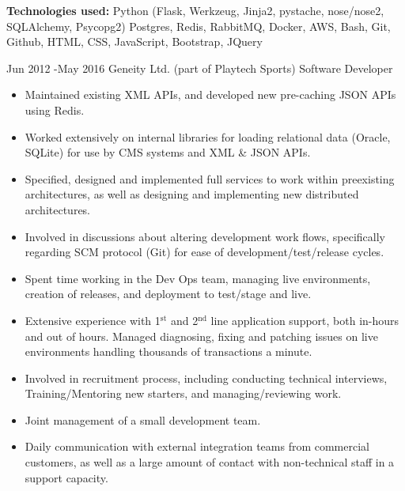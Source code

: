 \documentclass[10pt]{article} %
\begin{document}
  \textbf{Technologies used:}
  Python (Flask, Werkzeug, Jinja2, pystache, nose/nose2, SQLAlchemy, Psycopg2)
  Postgres, Redis, RabbitMQ, Docker, AWS,
  Bash,
  Git, Github,
  HTML, CSS, JavaScript, Bootstrap, JQuery


\jobheader
{Jun 2012 -}{May 2016}
{Geneity Ltd. (part of Playtech Sports)}
{Software Developer}
\vspace{-1cm}
  \begin{itemize}

  \item Maintained existing XML APIs, and developed new pre-caching JSON APIs using Redis.

  \item Worked extensively on internal libraries for loading relational data (Oracle, SQLite)
        for use by CMS systems and XML \& JSON APIs.

  \item Specified, designed and implemented full services to work within preexisting architectures,
        as well as designing and implementing new distributed architectures.

  \item Involved in discussions about altering development work flows, specifically regarding
        SCM protocol (Git) for ease of development/test/release cycles.

  \item Spent time working in the Dev Ops team, managing live environments, creation
        of releases, and deployment to test/stage and live.

  \item Extensive experience with 1$^{\textrm{st}}$ and 2$^{\textrm{nd}}$ line application
        support, both in-hours and out of hours. Managed diagnosing, fixing and patching
        issues on live environments handling thousands of transactions a minute.

  \item Involved in recruitment process, including conducting technical interviews,
        Training/Mentoring new starters, and managing/reviewing work.

  \item Joint management of a small development team.

  \item Daily communication with external integration teams from commercial customers, as well as
        a large amount of contact with non-technical staff in a support capacity.


  \end{itemize}
\end{document}
